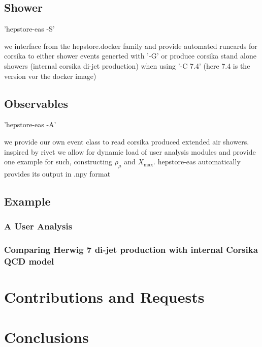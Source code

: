 \documentclass[aps,prd,11pt,tightenlines,superscriptaddress,nofootinbib,preprintnumbers,notitlepage]{revtex4-1}
\begin{document}
\subsection{Shower}

'hepstore-eas -S'

we interface from the hepstore.docker family and provide automated
runcards for corsika to either shower events generted with '-G' or
produce corsika stand alone showers (internal corsika di-jet
production) when using '-C 7.4' (here 7.4 is the version vor the
docker image)

\subsection{Observables}

'hepstore-eas -A'

we provide our own event class to read corsika produced extended air
showers. inspired by rivet we allow for dynamic load of user analysis
modules and provide one example for such, constructing $\rho_\mu$ and
$X_\text{max}$. hepstore-eas automatically provides its output in .npy
format

\subsection{Example}

\subsubsection{A User Analysis}

\subsubsection{Comparing Herwig 7 di-jet production with internal Corsika QCD model}

\section{Contributions and Requests}

\section{Conclusions}
\end{document}
